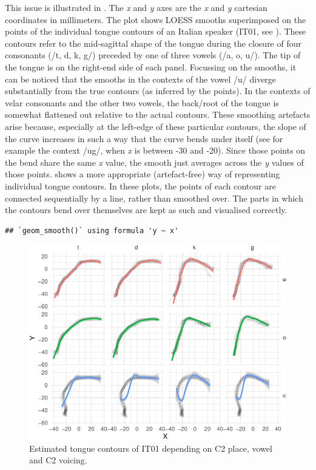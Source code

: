\documentclass[
  11pt,
]{article}
\begin{document}
This issue is illustrated in . The \emph{x} and
\emph{y} axes are the \emph{x} and \emph{y} cartesian coordinates in
millimeters. The plot shows LOESS smooths superimposed on the points of
the individual tongue contours of an Italian speaker (IT01, see
). These contours refer to the mid-sagittal shape of the
tongue during the closure of four consonants (/t, d, k, g/) preceded by
one of three vowels (/a, o, u/). The tip of the tongue is on the
right-end side of each panel. Focussing on the smooths, it can be
noticed that the smooths in the contexts of the vowel /u/ diverge
substantially from the true contours (as inferred by the points). In the
contexts of velar consonants and the other two vowels, the back/root of
the tongue is somewhat flattened out relative to the actual contours.
These smoothing artefacts arise because, especially at the left-edge of
these particular contours, the slope of the curve increases in such a
way that the curve bends under itself (see for example the context /ug/,
when \emph{x} is between -30 and -20). Since those points on the bend
share the same \emph{x} value, the smooth just averages across the
\emph{y} values of those points.  shows a more
appropriate (artefact-free) way of representing individual tongue
contours. In these plots, the points of each contour are connected
sequentially by a line, rather than smoothed over. The parts in which
the contours bend over themselves are kept as such and visualised
correctly.

\begin{verbatim}
## `geom_smooth()` using formula 'y ~ x'
\end{verbatim}

\begin{figure}

{\centering \includegraphics[width=\linewidth]{2018-polar-gam_files/figure-latex/Figure02} 

}

\caption{Estimated tongue contours of IT01 depending on C2 place, vowel and C2 voicing.}\label{f:Figure02}
\end{figure}
\end{document}
